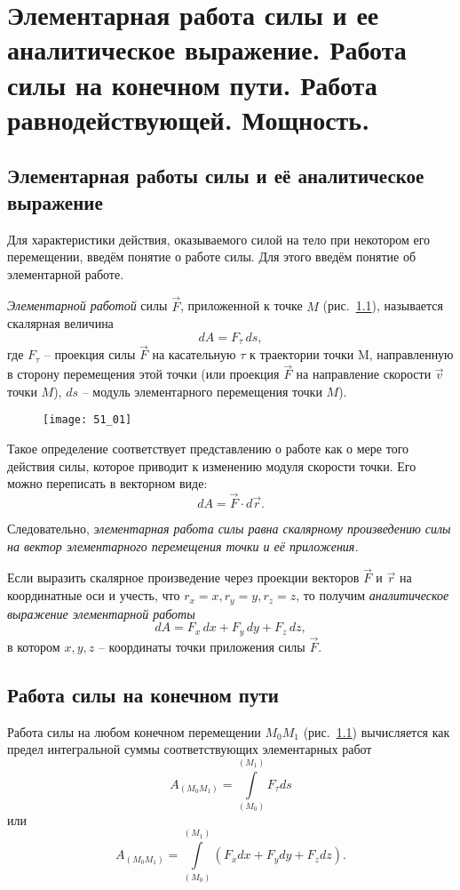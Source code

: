 \chapter{Элементарная работа силы и ее аналитическое выражение. Работа силы на
конечном пути. Работа равнодействующей. Мощность.}

\section{Элементарная работы силы и её аналитическое выражение}
Для характеристики действия, оказываемого силой на тело при некотором его 
перемещении, введём понятие о работе силы. Для этого введём понятие об 
элементарной работе.

\emph{Элементарной работой} силы \( \vec{F} \), приложенной к точке 
\( M \) (рис.~\ref{pic51_01}), называется скалярная величина
\[
	dA = F_\tau\,ds,
\]
где \( F_\tau \) -- проекция силы \( \vec{F} \) на касательную \( \tau \) 
к траектории точки M, направленную в сторону перемещения этой точки 
(или проекция \( \vec{F} \) на направление скорости \( \vec{v} \) точки 
\( M \)), \( ds \) -- модуль элементарного перемещения точки \( M \)).

\begin{figure}[h!]
	\center
    \texttt{[image: 51\_01]}
    \caption{}
    \label{pic51_01}
\end{figure}

Такое определение соответствует представлению о работе как о мере того 
действия силы, которое приводит к изменению модуля скорости точки. Его можно
переписать в векторном виде:
\[
    dA = \vec{F}\cdot d\vec{r}.
\]

Следовательно, \emph{элементарная работа силы равна скалярному произведению 
силы на вектор элементарного перемещения точки и её приложения.}

Если выразить скалярное произведение через проекции векторов \( \vec{F} \) 
и \( \vec{r} \) на координатные оси и учесть, что 
\( r_x = x, r_y = y, r_z = z \), то получим \emph{аналитическое выражение 
элементарной работы}
\[
    dA = F_x\,dx + F_y\,dy + F_z\,dz,
\]
в котором \( x, y, z \) -- координаты точки приложения силы \( \vec{F} \).

\section{Работа силы на конечном пути}
Работа силы на любом конечном перемещении \( M_0 M_1 \) (рис.~\ref{pic51_01}) 
вычисляется как предел интегральной суммы соответствующих элементарных 
работ 
\[
    A_{(M_0 M_1)} = \int\limits_{(M_0)}^{(M_1)} F_\tau ds
\]
или 
\[ 
    A_{(M_0 M_1)} = \int\limits_{(M_0)}^{(M_1)} 
    \left( F_x dx + F_y dy + F_z dz \right).
\]

